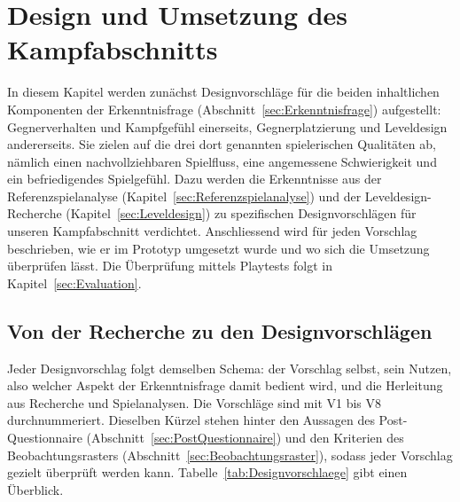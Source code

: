 \documentclass[../Main.tex]{subfiles}
\begin{document}
\section{Design und Umsetzung des Kampfabschnitts} \label{sec:Umsetzung}

In diesem Kapitel werden zunächst Designvorschläge für die beiden inhaltlichen Komponenten der Erkenntnisfrage (Abschnitt~\ref{sec:Erkenntnisfrage}) aufgestellt: Gegnerverhalten und Kampfgefühl einerseits, Gegnerplatzierung und Leveldesign andererseits. Sie zielen auf die drei dort genannten spielerischen Qualitäten ab, nämlich einen nachvollziehbaren Spielfluss, eine angemessene Schwierigkeit und ein befriedigendes Spielgefühl. Dazu werden die Erkenntnisse aus der Referenzspielanalyse (Kapitel~\ref{sec:Referenzspielanalyse}) und der Leveldesign-Recherche (Kapitel~\ref{sec:Leveldesign}) zu spezifischen Designvorschlägen für unseren Kampfabschnitt verdichtet. Anschliessend wird für jeden Vorschlag beschrieben, wie er im Prototyp umgesetzt wurde und wo sich die Umsetzung überprüfen lässt. Die Überprüfung mittels Playtests folgt in Kapitel~\ref{sec:Evaluation}.

\subsection{Von der Recherche zu den Designvorschlägen} \label{sec:Designvorschlaege}

Jeder Designvorschlag folgt demselben Schema: der Vorschlag selbst, sein Nutzen, also welcher Aspekt der Erkenntnisfrage damit bedient wird, und die Herleitung aus Recherche und Spielanalysen. Die Vorschläge sind mit V1 bis V8 durchnummeriert. Dieselben Kürzel stehen hinter den Aussagen des Post-Questionnaire (Abschnitt~\ref{sec:PostQuestionnaire}) und den Kriterien des Beobachtungsrasters (Abschnitt~\ref{sec:Beobachtungsraster}), sodass jeder Vorschlag gezielt überprüft werden kann. Tabelle~\ref{tab:Designvorschlaege} gibt einen Überblick.
\end{document}
